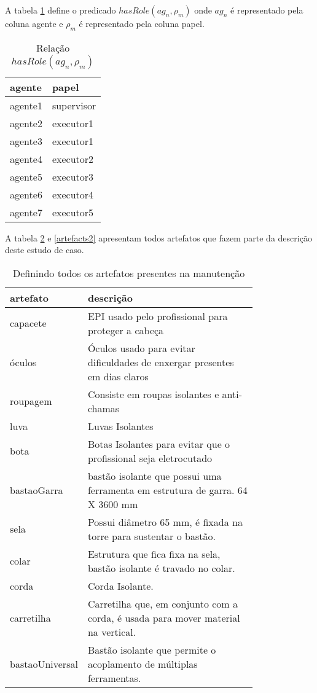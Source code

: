 A tabela \ref{agentsroles} define o predicado $hasRole(ag_n,\rho_m)$ onde $ag_n$ é representado pela coluna agente e $\rho_m$ é representado pela coluna papel.

\begin{table}[H]
\centering
\begin{tabular}{|l|l|}
\hline
\textbf{agente} & \textbf{papel} \\ \hline
agente1 & supervisor \\ \hline
agente2 & executor1 \\ \hline
agente3 & executor1 \\ \hline
agente4 & executor2 \\ \hline
agente5 & executor3 \\ \hline
agente6 & executor4 \\ \hline
agente7 & executor5 \\ \hline
\end{tabular}
\caption{Relação $hasRole(ag_n,\rho_m)$}
\label{agentsroles}
\end{table}

A tabela \ref{artefacts1} e \ref{artefacts2} apresentam todos artefatos que fazem parte da descrição deste estudo de caso.

\begin{table}[H]
\centering
\begin{tabular}{|l|p{0.8\linewidth}|}
\hline
\textbf{artefato} & \textbf{descrição} \\ \hline
capacete & EPI usado pelo profissional para proteger a cabeça \\ \hline
óculos & Óculos usado para evitar dificuldades de enxergar presentes em dias claros \\ \hline
roupagem & Consiste em roupas isolantes e anti-chamas \\ \hline
luva & Luvas Isolantes \\ \hline
bota & Botas Isolantes para evitar que o profissional seja eletrocutado \\ \hline
bastaoGarra & bastão isolante que possui uma ferramenta em estrutura de garra. 64 X 3600 mm \\ \hline
sela & Possui diâmetro 65 mm, é fixada na torre para sustentar o bastão. \\ \hline
colar & Estrutura que fica fixa na sela, bastão isolante é travado no colar. \\ \hline
corda & Corda Isolante. \\ \hline
carretilha & Carretilha que, em conjunto com a corda, é usada para mover material na vertical. \\ \hline
bastaoUniversal & Bastão isolante que permite o acoplamento de múltiplas ferramentas. \\ \hline
\end{tabular}
\caption{Definindo todos os artefatos presentes na manutenção}
\label{artefacts1}
\end{table} 

